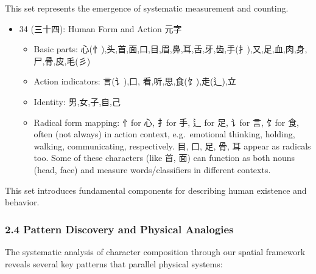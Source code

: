 \documentclass[
]{article}
\providecommand{\tightlist}{%
  \setlength{\itemsep}{0pt}\setlength{\parskip}{0pt}}
\begin{document}
This set represents the emergence of systematic measurement and
counting.

\begin{itemize}
\tightlist
\item
  34 (三十四): Human Form and Action 元字

  \begin{itemize}
  \tightlist
  \item
    Basic parts:
    心(忄),头,首,面,口,目,眉,鼻,耳,舌,牙,齿,手(扌),又,足,血,肉,身,尸,骨,皮,毛(彡)
  \item
    Action indicators: 言(讠),口, 看,听,思,食(饣),走(辶),立
  \item
    Identity: 男,女,子,自,己
  \item
    Radical form mapping: 忄for 心, 扌for 手, 辶 for 足, 讠for 言, 饣for
    食, often (not always) in action context, e.g.~emotional thinking,
    holding, walking, communicating, respectively. 目, 口, 足, 骨, 耳
    appear as radicals too. Some of these characters (like 首, 面) can
    function as both nouns (head, face) and measure words/classifiers in
    different contexts.
  \end{itemize}
\end{itemize}

This set introduces fundamental components for describing human
existence and behavior.

\subsubsection{2.4 Pattern Discovery and Physical
Analogies}\label{pattern-discovery-and-physical-analogies}

The systematic analysis of character composition through our spatial
framework reveals several key patterns that parallel physical systems:
\end{document}
